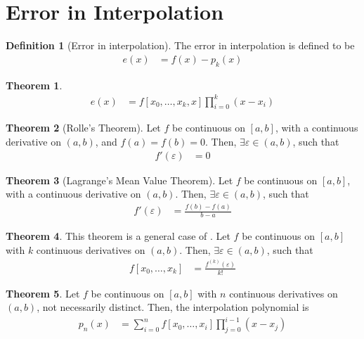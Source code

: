 \documentclass[fleqn, a4paper, 12pt, twoside, titlepage]{article}
\theoremstyle{definition}
\newtheorem{definition}{Definition}
\theoremstyle{theorem}
\newtheorem{theorem}{Theorem}
\begin{document}
\section{Error in Interpolation}

\begin{definition}[Error in interpolation]
	The error in interpolation is defined to be
	\begin{align*}
		e(x) &= f(x) - p_k(x)
	\end{align*}
\end{definition}

\begin{theorem}
	\begin{align*}
		e(x) &= f[x_0,\dots,x_k,x] \prod\limits_{i = 0}^{k} (x - x_i)
	\end{align*}
\end{theorem}

\begin{theorem}[Rolle's Theorem]
	Let $f$ be continuous on $[a,b]$, with a continuous derivative on $(a,b)$, and $f(a) = f(b) = 0$.
	Then, $\exists \varepsilon \in (a,b)$, such that
	\begin{align*}
		f'(\varepsilon) &= 0
	\end{align*}
	\label{Rolle's_Theorem}
\end{theorem}

\begin{theorem}[Lagrange's Mean Value Theorem]
	Let $f$ be continuous on $[a,b]$, with a continuous derivative on $(a,b)$.
	Then, $\exists \varepsilon \in (a,b)$, such that
	\begin{align*}
		f'(\varepsilon) &= \frac{f(b) - f(a)}{b - a}
	\end{align*}
	\label{Lagrange's_Mean_Value_Theorem}
\end{theorem}

\begin{theorem}
	\marginnote
	{
		This theorem is a general case of .
	}
	Let $f$ be continuous on $[a,b]$ with $k$ continuous derivatives on $(a,b)$.
	Then, $\exists \varepsilon \in (a,b)$, such that
	\begin{align*}
		f[x_0,\dots,x_k] &= \frac{f^{(k)}(\varepsilon)}{k!}
	\end{align*}
\end{theorem}

\begin{theorem}
	Let $f$ be continuous on $[a,b]$ with $n$ continuous derivatives on $(a,b)$, not necessarily distinct.
	Then, the interpolation polynomial is
	\begin{align*}
		p_n(x) &= \sum\limits_{i = 0}^{n} f[x_0,\dots,x_i] \prod\limits_{j = 0}^{i - 1} (x - x_j)
	\end{align*}
\end{theorem}
\end{document}
